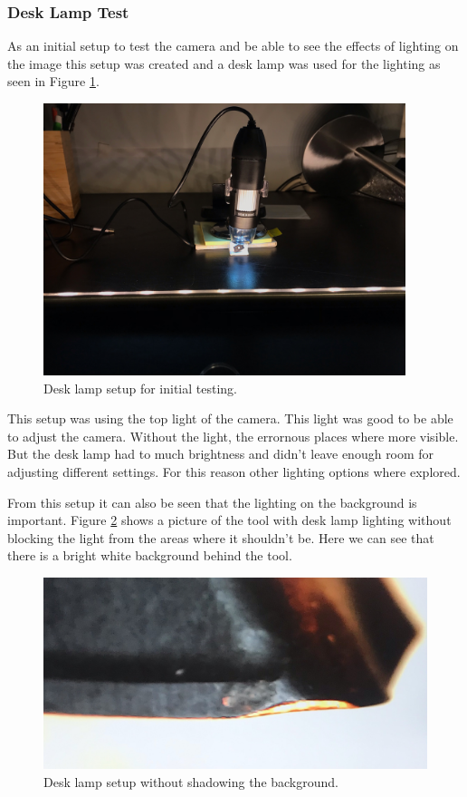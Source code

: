 		\subsubsection{Desk Lamp Test}

As an initial setup to test the camera and be able to see the effects of lighting on the image this setup was created and a desk lamp was used for the lighting as seen in Figure \ref{fig:setup:desklamp}.

\begin{figure}[hbtp]
\includegraphics[width=4.166667in, keepaspectratio=true]{./fig/Camera_setup/Light/Desk_Lamp_Test/eerste_setup_andere_richting.jpeg}
\caption{Desk lamp setup for initial testing.}
\label{fig:setup:desklamp}
\end{figure}

This setup was using the top light of the camera. This light was good to be able to adjust the camera. Without the light, the errornous places where more visible. But the desk lamp had to much brightness and didn't leave enough room for adjusting different settings. For this reason other lighting options where explored.

From this setup it can also be seen that the lighting on the background is important. Figure \ref{fig:setup:desklamp:whitebg} shows a picture of the tool with desk lamp lighting without blocking the light from the areas where it shouldn't be. Here we can see that there is a bright white background behind the tool. 

\begin{figure}[hbtp]
\centering
\includegraphics[scale=0.2]{fig/Camera_setup/Light/Desk_Lamp_Test/desk_lamp_setup_whitebg.jpeg}
\caption{Desk lamp setup without shadowing the background.}
\label{fig:setup:desklamp:whitebg}
\end{figure}


